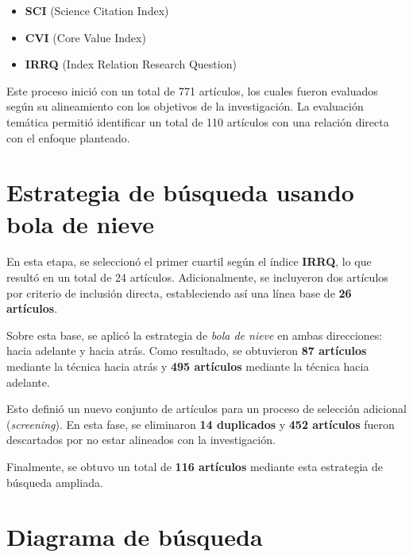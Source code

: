 \begin{itemize}
    \item \textbf{SCI} (Science Citation Index)
    \item \textbf{CVI} (Core Value Index)
    \item \textbf{IRRQ} (Index Relation Research Question)
\end{itemize}

Este proceso inició con un total de 771 artículos, los cuales fueron evaluados según su alineamiento con los objetivos de la investigación. La evaluación temática permitió identificar un total de 110 artículos con una relación directa con el enfoque planteado.

\section{Estrategia de búsqueda usando bola de nieve}\label{sec:bolaDeNieve}

En esta etapa, se seleccionó el primer cuartil según el índice \textbf{IRRQ}, lo que resultó en un total de 24 artículos. Adicionalmente, se incluyeron dos artículos por criterio de inclusión directa, estableciendo así una línea base de \textbf{26 artículos}. 

Sobre esta base, se aplicó la estrategia de \textit{bola de nieve} en ambas direcciones: hacia adelante y hacia atrás. Como resultado, se obtuvieron \textbf{87 artículos} mediante la técnica hacia atrás y \textbf{495 artículos} mediante la técnica hacia adelante. 

Esto definió un nuevo conjunto de artículos para un proceso de selección adicional (\textit{screening}). En esta fase, se eliminaron \textbf{14 duplicados} y \textbf{452 artículos} fueron descartados por no estar alineados con la investigación. 

Finalmente, se obtuvo un total de \textbf{116 artículos} mediante esta estrategia de búsqueda ampliada.

\section{Diagrama de búsqueda}\label{sec:diagramaBusqueda}

